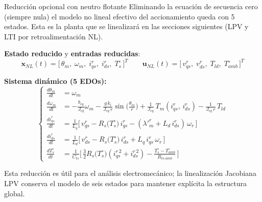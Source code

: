 \documentclass[aspectratio=169,t]{beamer}
\begin{document}
\begin{frame}{Reducción opcional con neutro flotante}
{\small\color{uncGray}Eliminando la ecuación de secuencia cero (siempre nula) el modelo no lineal efectivo del accionamiento queda con 5 estados. Esta es la planta que se linealizará en las secciones siguientes (LPV y LTI por retroalimentación NL).}\par
\vspace{2mm}

\textbf{Estado reducido} y \textbf{entradas reducidas}:
\begin{equation*}
\bm{x}_{NL}(t) = \big[\,\theta_m,\;\omega_m,\;i_{qs}^{r},\;i_{ds}^{r},\;T_s^\circ\,\big]^T
\qquad
\bm{u}_{NL}(t) = \big[\,v_{qs}^{r},\;v_{ds}^{r},\;T_{ld},\;T_{amb}^\circ\,\big]^T
\end{equation*}

\textbf{Sistema dinámico (5 EDOs):}
\footnotesize
\begin{equation*}
\left\{
\begin{aligned}
\frac{d\theta_m}{dt} &= \omega_m \\
\frac{d\omega_m}{dt} &= -\tfrac{b_{eq}}{J_{eq}}\omega_m - \tfrac{g\,k_l}{J_{eq}\,r}\sin\!\big(\tfrac{\theta_m}{r}\big) + \tfrac{1}{J_{eq}}\,T_m(i_{qs}^{r},\,i_{ds}^{r}) - \tfrac{1}{J_{eq}\,r}\,T_{ld} \\
\frac{di_{qs}^{r}}{dt} &= \tfrac{1}{L_q}\!\big[\,v_{qs}^{r} - R_s\!\big(T_s^\circ\big)\, i_{qs}^{r} - (\lambda'^r_m + L_d\,i_{ds}^{r})\,\omega_r\,\big] \\
\frac{di_{ds}^{r}}{dt} &= \tfrac{1}{L_d}\!\big[\,v_{ds}^{r} - R_s\!\big(T_s^\circ\big)\, i_{ds}^{r} + L_q\,i_{qs}^{r}\,\omega_r\,\big] \\
\frac{dT_s^\circ}{dt} &= \tfrac{1}{C_{ts}}\!\big[\,\tfrac{3}{2}R_s\!\big(T_s^\circ\big)(i_{qs}^{r\,2}+i_{ds}^{r\,2}) - \tfrac{T_s^\circ - T_{amb}^\circ}{R_{ts\text{-}amb}}\,\big]
\end{aligned}\right.
\end{equation*}
\normalsize

\vspace{1mm}
{\small Esta reducción es útil para el análisis electromecánico; la linealización Jacobiana LPV conserva el modelo de seis estados para mantener explícita la estructura global.}
\end{frame}
\end{document}
